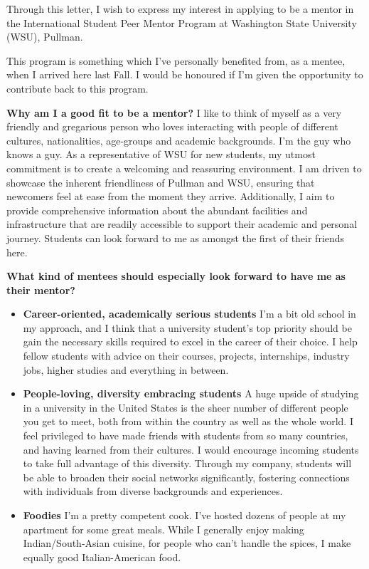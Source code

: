 \documentclass[color, 10pt, letterpaper]{coverletter}
\begin{document}
    Through this letter, I wish to express my interest in applying to be a mentor in the International Student Peer Mentor Program at Washington State University (WSU), Pullman.

    This program is something which I've personally benefited from, as a mentee, when I arrived here last Fall. I would be honoured if I'm given the opportunity to contribute back to this program.

    \textbf{Why am I a good fit to be a mentor?}
    I like to think of myself as a very friendly and gregarious person who loves interacting with people of different cultures, nationalities, age-groups and academic backgrounds. I'm the guy who knows a guy. As a representative of WSU for new students, my utmost commitment is to create a welcoming and reassuring environment. I am driven to showcase the inherent friendliness of Pullman and WSU, ensuring that newcomers feel at ease from the moment they arrive. Additionally, I aim to provide comprehensive information about the abundant facilities and infrastructure that are readily accessible to support their academic and personal journey. Students can look forward to me as amongst the first of their friends here.

    \textbf{What kind of mentees should especially look forward to have me as their mentor?}
    \begin{itemize}[noitemsep,topsep=0pt]
        \item \textbf{Career-oriented, academically serious students} I'm a bit old school in my approach, and I think that a university student's top priority should be gain the necessary skills required to excel in the career of their choice. I help fellow students with advice on their courses, projects, internships, industry jobs, higher studies and everything in between.
        \item \textbf{People-loving, diversity embracing students} A huge upside of studying in a university in the United States is the sheer number of different people you get to meet, both from within the country as well as the whole world. I feel privileged to have made friends with students from so many countries, and having learned from their cultures. I would encourage incoming students to take full advantage of this diversity. Through my company, students will be able to broaden their social networks significantly, fostering connections with individuals from diverse backgrounds and experiences.
        \item \textbf{Foodies} I'm a pretty competent cook. I've hosted dozens of people at my apartment for some great meals. While I generally enjoy making Indian/South-Asian cuisine, for people who can't handle the spices, I make equally good Italian-American food.
    \end{itemize}
\end{document}
